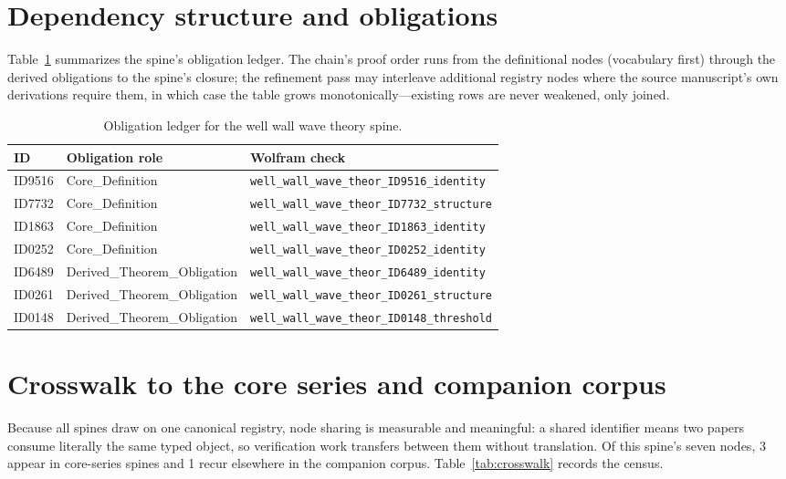 \documentclass[11pt]{article}
\theoremstyle{remark}
\begin{document}
\section{Dependency structure and obligations}
\label{sec:dep}

Table~\ref{tab:obligations} summarizes the spine's obligation ledger. The chain's proof order runs from the definitional nodes (vocabulary first) through the derived obligations to the spine's closure; the refinement pass may interleave additional registry nodes where the source manuscript's own derivations require them, in which case the table grows monotonically---existing rows are never weakened, only joined.

\begin{table}[ht]
\centering
\small
\caption{Obligation ledger for the well wall wave theory spine.}
\label{tab:obligations}
\begin{tabular}{llp{6.2cm}}
\toprule
ID & Obligation role & Wolfram check \\
\midrule
ID9516 & Core\_Definition & \texttt{well\_wall\_wave\_theor\_ID9516\_identity} \\
ID7732 & Core\_Definition & \texttt{well\_wall\_wave\_theor\_ID7732\_structure} \\
ID1863 & Core\_Definition & \texttt{well\_wall\_wave\_theor\_ID1863\_identity} \\
ID0252 & Core\_Definition & \texttt{well\_wall\_wave\_theor\_ID0252\_identity} \\
ID6489 & Derived\_Theorem\_Obligation & \texttt{well\_wall\_wave\_theor\_ID6489\_identity} \\
ID0261 & Derived\_Theorem\_Obligation & \texttt{well\_wall\_wave\_theor\_ID0261\_structure} \\
ID0148 & Derived\_Theorem\_Obligation & \texttt{well\_wall\_wave\_theor\_ID0148\_threshold} \\
\bottomrule
\end{tabular}
\end{table}

\section{Crosswalk to the core series and companion corpus}
\label{sec:crosswalk}

Because all spines draw on one canonical registry, node sharing is measurable and meaningful: a shared identifier means two papers consume literally the same typed object, so verification work transfers between them without translation. Of this spine's seven nodes, 3 appear in core-series spines and 1 recur elsewhere in the companion corpus. Table~\ref{tab:crosswalk} records the census.
\end{document}
